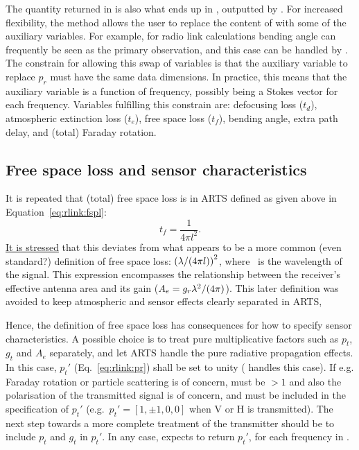 The quantity returned in  is also what ends up in
, outputted by . For increased flexibility, the
method  allows the user to replace the content
of  with some of the auxiliary variables. For example, for radio
link calculations bending angle can frequently be seen as the primary
observation, and this case can be handled by .
The constrain for allowing this swap of variables is that the auxiliary
variable to replace $p_r$ must have the same data dimensions. In practice, this
means that the auxiliary variable is a function of frequency, possibly being a
Stokes vector for each frequency. Variables fulfilling this constrain are:
defocusing loss ($t_d$), atmospheric extinction loss ($t_e$), free space loss
($t_f$), bending angle, extra path delay, and (total) Faraday rotation.


\subsection{Free space loss and sensor characteristics}
\label{sec:rlinks:free}

It is repeated that (total) free space loss is in ARTS defined as given
above in Equation~\ref{eq:rlink:fspl}:
\begin{displaymath}
  t_f = \frac{1}{4\pi l^2}.
\end{displaymath}
\underline{It is stressed} that this deviates from what
appears to be a more common (even standard?) definition of free space loss:
$\left(\lambda/(4 \pi l)\right)^2$, where \Wvl\ is the wavelength of the
signal. This expression encompasses the relationship between the receiver's
effective antenna area and its gain ($A_e=g_r\lambda^2/(4\pi)$). This later
definition was avoided to keep atmospheric and sensor effects clearly separated
in ARTS,

Hence, the definition of free space loss has consequences for how to specify
sensor characteristics. A possible choice is to treat pure multiplicative
factors such as $p_t$, $g_t$ and $A_e$ separately, and let ARTS handle the pure
radiative propagation effects. In this case, $p_t'$ (Eq.~\ref{eq:rlink:pr})
shall be set to unity ( handles this case). If
e.g. Faraday rotation or particle scattering is of concern,
 must be $>1$ and also the polarisation of the
transmitted signal is of concern, and must be included in the specification of
$p_t'$ (e.g.\ $p_t'=[1,\pm1,0,0]$ when V or H is transmitted). The next step
towards a more complete treatment of the transmitter should be to include $p_t$
and $g_t$ in $p_t'$. In any case,  expects
 to return $p_t'$, for each frequency in
.

